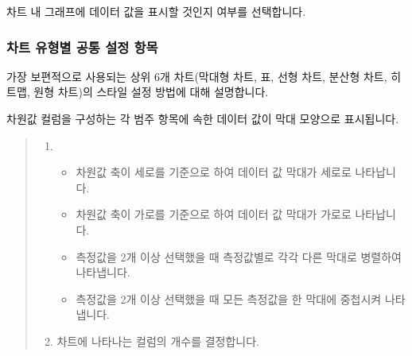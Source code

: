 \documentclass[letterpaper,10pt,english]{sphinxmanual}
\begin{document}

차트 내 그래프에 데이터 값을 표시할 것인지 여부를 선택합니다.
\begin{quote}

\begin{figure}[H]
\centering

\noindent{}
\end{figure}
\end{quote}


\subsubsection{차트 유형별 공통 설정 항목}
\label{\detokenize{discovery/part04/chart_style:id3}}
가장 보편적으로 사용되는 상위 6개 차트(막대형 차트, 표, 선형 차트, 분산형 차트, 히 트맵, 원형 차트)의 스타일 설정 방법에 대해 설명합니다.
\begin{quote}

\begin{figure}[H]
\centering

\noindent{}
\end{figure}
\end{quote}


차원값 컬럼을 구성하는 각 범주 항목에 속한 데이터 값이 막대 모양으로 표시됩니다.
\begin{quote}

\begin{figure}[H]
\centering

\noindent{}
\end{figure}
\begin{enumerate}
\def\theenumi{\arabic{enumi}}
\def\labelenumi{\theenumi .}
\makeatletter\def\p@enumii{\p@enumi \theenumi .}\makeatother
\item {} 
\begin{itemize}
\item {} 
 차원값 축이 세로를 기준으로 하여 데이터 값 막대가 세로로 나타납니다.

\item {} 
 차원값 축이 가로를 기준으로 하여 데이터 값 막대가 가로로 나타납니다.

\item {} 
 측정값을 2개 이상 선택했을 때 측정값별로 각각 다른 막대로 병렬하여 나타냅니다.

\item {} 
 측정값을 2개 이상 선택했을 때 모든 측정값을 한 막대에 중첩시켜 나타냅니다.

\end{itemize}

\item {} 
 차트에 나타나는 컬럼의 개수를 결정합니다.

\end{enumerate}
\end{quote}
\end{document}
